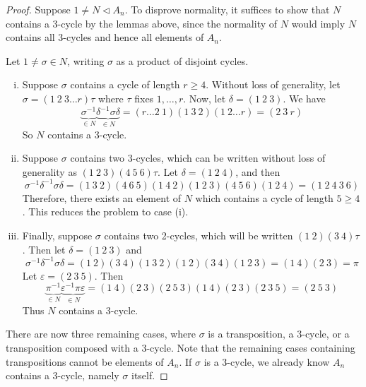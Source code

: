 \begin{proof}
	Suppose \( 1 \neq N \triangleleft A_n \).
	To disprove normality, it suffices to show that \( N \) contains a 3-cycle by the lemmas above, since the normality of \( N \) would imply \( N \) contains all 3-cycles and hence all elements of \( A_n \).

	Let \( 1 \neq \sigma \in N \), writing \( \sigma \) as a product of disjoint cycles.
	\begin{enumerate}[(i)]
		\item Suppose \( \sigma \) contains a cycle of length \( r \geq 4 \).
			Without loss of generality, let \( \sigma = (1\ 2\ 3\dots r) \tau \) where \( \tau \) fixes \( 1, \dots, r \).
			Now, let \( \delta = (1\ 2\ 3) \).
			We have
			\[ \underbrace{\sigma^{-1}}_{\in N} \underbrace{\delta^{-1} \sigma \delta}_{\in N} = (r \dots 2\ 1)(1\ 3\ 2)(1\ 2\dots r) = (2\ 3\ r) \]
			So \( N \) contains a 3-cycle.
		\item Suppose \( \sigma \) contains two 3-cycles, which can be written without loss of generality as \( (1\ 2\ 3)(4\ 5\ 6) \tau \).
			Let \( \delta = (1\ 2\ 4) \), and then
			\[ \sigma^{-1} \delta^{-1} \sigma \delta = (1\ 3\ 2)(4\ 6\ 5)(1\ 4\ 2)(1\ 2\ 3)(4\ 5\ 6)(1\ 2\ 4) = (1\ 2\ 4\ 3\ 6) \]
			Therefore, there exists an element of \( N \) which contains a cycle of length \( 5 \geq 4 \).
			This reduces the problem to case (i).
		\item Finally, suppose \( \sigma \) contains two 2-cycles, which will be written \( (1\ 2)(3\ 4)\tau \).
			Then let \( \delta = (1\ 2\ 3) \) and
			\[ \sigma^{-1} \delta^{-1} \sigma \delta = (1\ 2)(3\ 4)(1\ 3\ 2)(1\ 2)(3\ 4)(1\ 2\ 3) = (1\ 4)(2\ 3) = \pi \]
			Let \( \varepsilon = (2\ 3\ 5) \).
			Then
			\[ \underbrace{\pi^{-1}}_{\in N} \underbrace{\varepsilon^{-1} \pi \varepsilon}_{\in N} = (1\ 4)(2\ 3)(2\ 5\ 3)(1\ 4)(2\ 3)(2\ 3\ 5) = (2\ 5\ 3) \]
			Thus \( N \) contains a 3-cycle.
	\end{enumerate}
	There are now three remaining cases, where \( \sigma \) is a transposition, a 3-cycle, or a transposition composed with a 3-cycle.
	Note that the remaining cases containing transpositions cannot be elements of \( A_n \).
	If \( \sigma \) is a 3-cycle, we already know \( A_n \) contains a 3-cycle, namely \( \sigma \) itself.
\end{proof}
